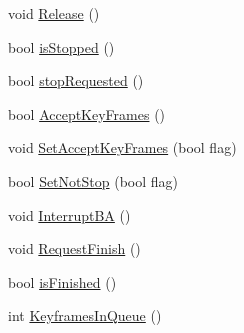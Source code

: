 \begin{DoxyCompactItemize}
\item 
void \mbox{\hyperlink{class_o_r_b___s_l_a_m2_1_1_local_mapping_aec0950308ba2d828d9dc16d5be34e654}{Release}} ()
\item 
bool \mbox{\hyperlink{class_o_r_b___s_l_a_m2_1_1_local_mapping_a964b156d8dfcedf91d61e47aa51e973a}{is\+Stopped}} ()
\item 
bool \mbox{\hyperlink{class_o_r_b___s_l_a_m2_1_1_local_mapping_a0474accda8e5e59048c10b1a71269881}{stop\+Requested}} ()
\item 
bool \mbox{\hyperlink{class_o_r_b___s_l_a_m2_1_1_local_mapping_ab0900c4ceaf6a615f53bc113f682daa6}{Accept\+Key\+Frames}} ()
\item 
void \mbox{\hyperlink{class_o_r_b___s_l_a_m2_1_1_local_mapping_a5b29c603541a13d670c53348e59081bf}{Set\+Accept\+Key\+Frames}} (bool flag)
\item 
bool \mbox{\hyperlink{class_o_r_b___s_l_a_m2_1_1_local_mapping_ae33aa5640d61d5434bd0ad00e27d8e76}{Set\+Not\+Stop}} (bool flag)
\item 
void \mbox{\hyperlink{class_o_r_b___s_l_a_m2_1_1_local_mapping_ad8fcbbdacfaeca558c5aaff32f42a57b}{Interrupt\+BA}} ()
\item 
void \mbox{\hyperlink{class_o_r_b___s_l_a_m2_1_1_local_mapping_ac22bd2b73269435e04c353190eae7c13}{Request\+Finish}} ()
\item 
bool \mbox{\hyperlink{class_o_r_b___s_l_a_m2_1_1_local_mapping_a06ce22a736be265a6856582d31e888d6}{is\+Finished}} ()
\item 
int \mbox{\hyperlink{class_o_r_b___s_l_a_m2_1_1_local_mapping_a8299d3b0c603784de01ac2242f4916be}{Keyframes\+In\+Queue}} ()
\end{DoxyCompactItemize}
